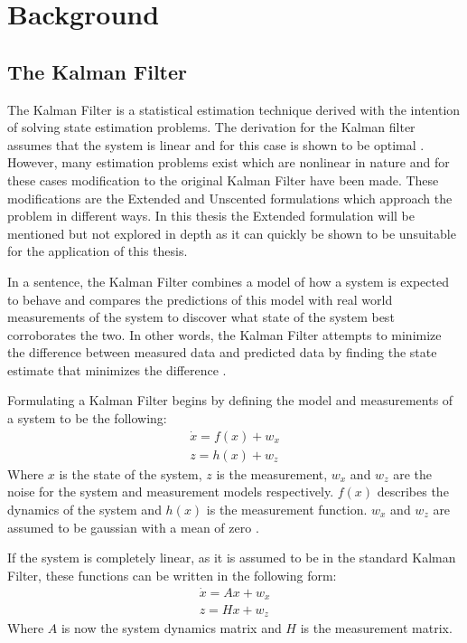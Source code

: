 \chapter{Background}

\section*{The Kalman Filter}
The Kalman Filter is a statistical estimation technique derived with the intention of solving state estimation problems. \cite{ukf_merwe} The derivation for the Kalman filter assumes that the system is linear and for this case is shown to be optimal \cite{kf_kalman}. However, many estimation problems exist which are nonlinear in nature and for these cases modification to the original Kalman Filter have been made. These modifications are the Extended and Unscented formulations which approach the problem in different ways. In this thesis the Extended formulation will be mentioned but not explored in depth as it can quickly be shown to be unsuitable for the application of this thesis.

In a sentence, the Kalman Filter combines a model of how a system is expected to behave and compares the predictions of this model with real world measurements of the system to discover what state of the system best corroborates the two. In other words, the Kalman Filter attempts to minimize the difference between measured data and predicted data by finding the state estimate that minimizes the difference \cite{kf_derivation}.

Formulating a Kalman Filter begins by defining the model and measurements of a system to be the following:
\begin{align}\label{system_functions}
\dot{x} = f(x) + w_x \\
z = h(x) + w_z
\end{align}
Where $x$ is the state of the system, $z$ is the measurement, $w_x$ and $w_z$ are the noise for the system and measurement models respectively. $f(x)$ describes the dynamics of the system and $h(x)$ is the measurement function. $w_x$ and $w_z$ are assumed to be gaussian with a mean of zero \cite{kf_derivation}. 

If the system is completely linear, as it is assumed to be in the standard Kalman Filter, these functions can be written in the following form:
\begin{align}\label{linear_systems}
\dot{x} = Ax + w_x \\
z = Hx + w_z
\end{align}
Where $A$ is now the system dynamics matrix and $H$ is the measurement matrix.

